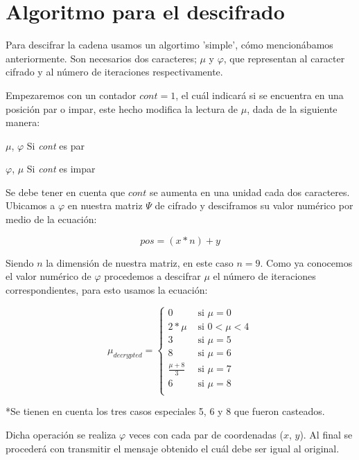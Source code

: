 \section{Algoritmo para el descifrado}
Para descifrar la cadena usamos un algortimo 'simple', c\'omo mencion\'abamos anteriormente. Son necesarios dos caracteres; $\mu$ y $\varphi$, que representan al caracter cifrado y al n\'umero de iteraciones respectivamente.

Empezaremos con un contador $cont = 1$, el cu\'al indicar\'a si se encuentra en una posici\'on par o impar, este hecho modifica la lectura de $\mu$, dada de la siguiente manera:

\begin{center}
$\mu$, $\varphi$ Si \emph{cont} es par 
\end{center}
\begin{center}
$\varphi$, $\mu$ Si \emph{cont} es impar
\end{center}

Se debe tener en cuenta que $cont$ se aumenta en una unidad cada dos caracteres. Ubicamos a $\varphi$ en nuestra matriz $\Psi$ de cifrado y desciframos su valor num\'erico por medio de la ecuaci\'on:

\begin{equation}
 pos = (x * n) + y
\end{equation}

Siendo $n$ la dimensi\'on de nuestra matriz, en este caso $n = 9$. Como ya conocemos el valor num\'erico de $\varphi$ procedemos a descifrar $\mu$ el n\'umero de iteraciones correspondientes, para esto usamos la ecuaci\'on:

\[ \mu_{decrypted} = 
\begin{cases} 
	0 	& \text { si } \mu = 0 \\
	2*\mu 	& \text { si }  0 < \mu < 4\\
	3 	& \text { si } \mu = 5 \\
	8 	& \text { si } \mu = 6 \\
	\frac{\mu+8}{3} & \text { si } \mu = 7 \\
	6 	& \text { si } \mu = 8 \\
\end{cases} 
\] 

*Se tienen en cuenta los tres casos especiales 5, 6 y 8 que fueron casteados.

Dicha operaci\'on se realiza $\varphi$ veces con cada par de coordenadas ($x$, $y$). Al final se proceder\'a con transmitir el mensaje obtenido el cu\'al debe ser igual al original.
